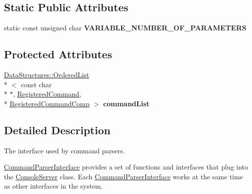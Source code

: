 \subsection*{Static Public Attributes}
\begin{DoxyCompactItemize}
\item 
\hypertarget{class_rak_net_1_1_command_parser_interface_a693eb4febc4fea6e6710ab20cf657eb7}{static const unsigned char {\bfseries V\-A\-R\-I\-A\-B\-L\-E\-\_\-\-N\-U\-M\-B\-E\-R\-\_\-\-O\-F\-\_\-\-P\-A\-R\-A\-M\-E\-T\-E\-R\-S}}\label{class_rak_net_1_1_command_parser_interface_a693eb4febc4fea6e6710ab20cf657eb7}

\end{DoxyCompactItemize}
\subsection*{Protected Attributes}
\begin{DoxyCompactItemize}
\item 
\hypertarget{class_rak_net_1_1_command_parser_interface_a1b92c2ad6cec6f92baf4f85e0cfa8504}{\hyperlink{class_data_structures_1_1_ordered_list}{Data\-Structures\-::\-Ordered\-List}\\*
$<$ const char \\*
$\ast$, \hyperlink{struct_rak_net_1_1_registered_command}{Registered\-Command}, \\*
\hyperlink{namespace_rak_net_a10d1d43d98fc240d38ff39f47dd29db0}{Registered\-Command\-Comp} $>$ {\bfseries command\-List}}\label{class_rak_net_1_1_command_parser_interface_a1b92c2ad6cec6f92baf4f85e0cfa8504}

\end{DoxyCompactItemize}


\subsection{Detailed Description}
The interface used by command parsers. 

\hyperlink{class_rak_net_1_1_command_parser_interface}{Command\-Parser\-Interface} provides a set of functions and interfaces that plug into the \hyperlink{class_rak_net_1_1_console_server}{Console\-Server} class. Each \hyperlink{class_rak_net_1_1_command_parser_interface}{Command\-Parser\-Interface} works at the same time as other interfaces in the system. 

